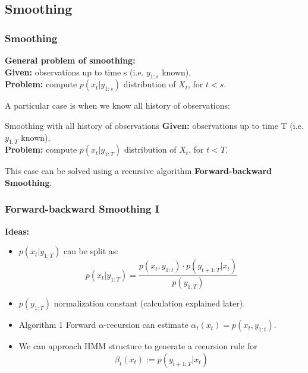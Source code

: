 \documentclass[xcolor=dvipsnames, compress]{beamer}
\begin{document}
\begin{frame}
\section{Smoothing}
\frametitle{Smoothing}

\textbf{General problem of smoothing:}\\
\textbf{Given:} observations up to time s (i.e. $y_{1:s}$ known),\\
\textbf{Problem:} compute $p(x_t | y_{1:s})$ distribution of $X_t$, for $t < s$.
\vspace{0.2cm}

A particular case is when we know all history of observations:

\begin{block}{Smoothing with all history of observations}
	\textbf{Given:} observations up to time T (i.e. $y_{1:T}$ known),\\
	\textbf{Problem:} compute $p(x_t | y_{1:T})$ distribution of $X_t$, for $t < T$.
\end{block}

This case can be solved using a recursive algorithm \textbf{Forward-backward Smoothing}.

\end{frame}


\begin{frame}
\frametitle{Forward-backward Smoothing I}

\textbf{Ideas:}

\begin{itemize}
\item  $p(x_t |y_{1:T})$ can be split as:
$$p(x_t |y_{1:T}) = \frac{p(x_t , y_{1:t} ) \cdot p(y_{t+1:T} |x_t )}
	{p(y_{1:T})}$$
	
\item $p(y_{1:T})$ normalization constant (calculation explained later).
	
\item Algorithm 1 Forward $\alpha$-recursion can estimate $\alpha_t(x_t)=p(x_t , y_{1:t} )$.

\item We can approach HMM structure to generate a recursion rule for $$\beta_t(x_t):=p(y_{t+1:T} |x_t )$$

\end{itemize}

\end{frame}
\end{document}
